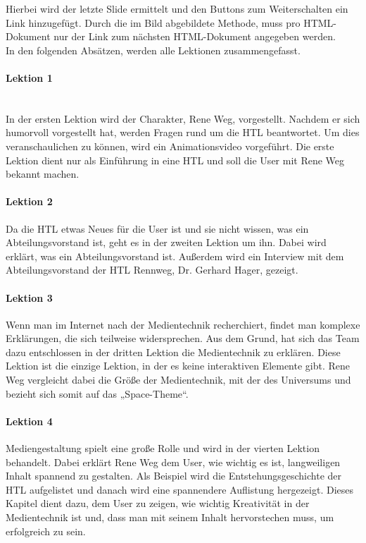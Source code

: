 Hierbei wird der letzte Slide ermittelt und den Buttons zum Weiterschalten ein Link hinzugefügt. Durch die im Bild abgebildete Methode, muss pro HTML-Dokument nur der Link zum nächsten HTML-Dokument angegeben werden. \leavevmode \\
In den folgenden Absätzen, werden alle Lektionen zusammengefasst. 
\paragraph{Lektion 1}\leavevmode \\
In der ersten Lektion wird der Charakter, Rene Weg, vorgestellt. Nachdem er sich humorvoll vorgestellt hat, werden Fragen rund um die HTL beantwortet. Um dies veranschaulichen zu können, wird ein Animationsvideo vorgeführt. Die erste Lektion dient nur als Einführung in eine HTL und soll die User mit Rene Weg bekannt machen. 
\paragraph{Lektion 2}
Da die HTL etwas Neues für die User ist und sie nicht wissen, was ein Abteilungsvorstand ist, geht es in der zweiten Lektion um ihn. Dabei wird erklärt, was ein Abteilungsvorstand ist. Außerdem wird ein Interview mit dem Abteilungsvorstand der HTL Rennweg, Dr. Gerhard Hager, gezeigt. 

\paragraph{Lektion 3}
Wenn man im Internet nach der Medientechnik recherchiert, findet man komplexe Erklärungen, die sich teilweise widersprechen. Aus dem Grund, hat sich das Team dazu entschlossen in der dritten Lektion die Medientechnik zu erklären. Diese Lektion ist die einzige Lektion, in der es keine interaktiven Elemente gibt. Rene Weg vergleicht dabei die Größe der Medientechnik, mit der des Universums und bezieht sich somit auf das „Space-Theme“. 

\paragraph{Lektion 4}
Mediengestaltung spielt eine große Rolle und wird in der vierten Lektion behandelt. Dabei erklärt Rene Weg dem User, wie wichtig es ist, langweiligen Inhalt spannend zu gestalten. Als Beispiel wird die Entstehungsgeschichte der HTL aufgelistet und danach wird eine spannendere Auflistung hergezeigt. Dieses Kapitel dient dazu, dem User zu zeigen, wie wichtig Kreativität in der Medientechnik ist und, dass man mit seinem Inhalt hervorstechen muss, um erfolgreich zu sein.

